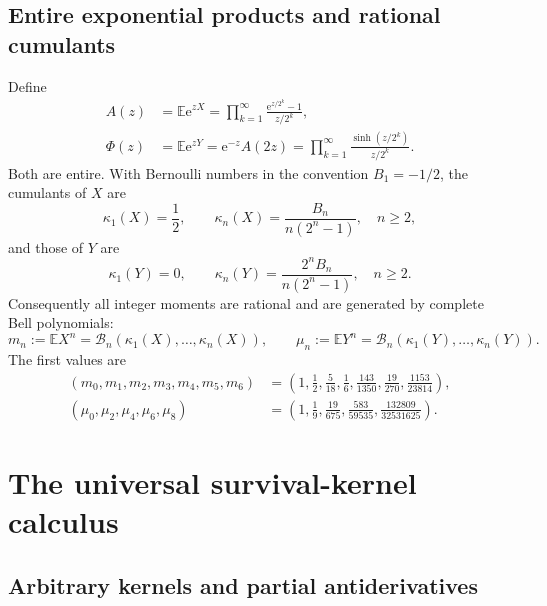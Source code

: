 \documentclass[11pt,oneside]{article}
\numberwithin{equation}{section}
\theoremstyle{definition}
\theoremstyle{remark}
\newcommand{\e}{\mathrm e}
\newcommand{\E}{\mathbb E}
\begin{document}
\subsection{Entire exponential products and rational cumulants}

Define
\begin{align}
 A(z)&=\E\e^{zX}
 =\prod_{k=1}^{\infty}\frac{\e^{z/2^k}-1}{z/2^k},
 \label{eq:Aproduct}\\
 \Phi(z)&=\E\e^{zY}
 =\e^{-z}A(2z)
 =\prod_{k=1}^{\infty}\frac{\sinh(z/2^k)}{z/2^k}.
 \label{eq:PhiProduct}
\end{align}
Both are entire.  With Bernoulli numbers in the convention \(B_1=-1/2\), the
cumulants of \(X\) are
\begin{equation}
 \kappa_1(X)=\frac12,
 \qquad
 \boxed{\kappa_n(X)=\frac{B_n}{n(2^n-1)},\quad n\ge2,}
 \label{eq:Xcumulants}
\end{equation}
and those of \(Y\) are
\begin{equation}
 \kappa_1(Y)=0,
 \qquad
 \boxed{\kappa_n(Y)=\frac{2^nB_n}{n(2^n-1)},\quad n\ge2.}
 \label{eq:Ycumulants}
\end{equation}
Consequently all integer moments are rational and are generated by complete
Bell polynomials:
\begin{equation}
 m_n:=\E X^n=\mathcal B_n(\kappa_1(X),\ldots,\kappa_n(X)),
 \qquad
 \mu_n:=\E Y^n=\mathcal B_n(\kappa_1(Y),\ldots,\kappa_n(Y)).
 \label{eq:BellMoments}
\end{equation}
The first values are
\begin{align}
 (m_0,m_1,m_2,m_3,m_4,m_5,m_6)
 &=\left(1,\frac12,\frac5{18},\frac16,\frac{143}{1350},
 \frac{19}{270},\frac{1153}{23814}\right),
 \label{eq:XmomentsLow}\\
 (\mu_0,\mu_2,\mu_4,\mu_6,\mu_8)
 &=\left(1,\frac19,\frac{19}{675},\frac{583}{59535},
 \frac{132809}{32531625}\right).
 \label{eq:YmomentsLow}
\end{align}

\section{The universal survival-kernel calculus}
\label{sec:survival}

\subsection{Arbitrary kernels and partial antiderivatives}
\end{document}
